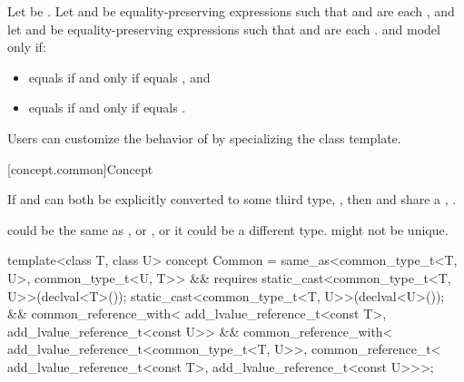 \begin{itemdescr}
\pnum
Let  be .
Let  and  be equality-preserving
expressions such that
 and  are each , and
let  and  be equality-preserving expressions such that
 and  are each .
 and  model 
only if:
\begin{itemize}
\item {} equals  if and only if
   equals , and
\item {} equals  if and only if
   equals .
\end{itemize}

\pnum
\begin{note}
Users can customize the behavior of  by specializing
the  class template.
\end{note}
\end{itemdescr}

[concept.common]{Concept }

\pnum
If  and  can both be explicitly converted to some third type,
, then  and  share a ,
.
\begin{note}
 could be the same as , or , or it could be a
different type.  might not be unique.
\end{note}

%
\begin{itemdecl}
template<class T, class U>
  concept Common =
    same_as<common_type_t<T, U>, common_type_t<U, T>> &&
    requires {
      static_cast<common_type_t<T, U>>(declval<T>());
      static_cast<common_type_t<T, U>>(declval<U>());
    } &&
    common_reference_with<
      add_lvalue_reference_t<const T>,
      add_lvalue_reference_t<const U>> &&
    common_reference_with<
      add_lvalue_reference_t<common_type_t<T, U>>,
      common_reference_t<
        add_lvalue_reference_t<const T>,
        add_lvalue_reference_t<const U>>>;
\end{itemdecl}

